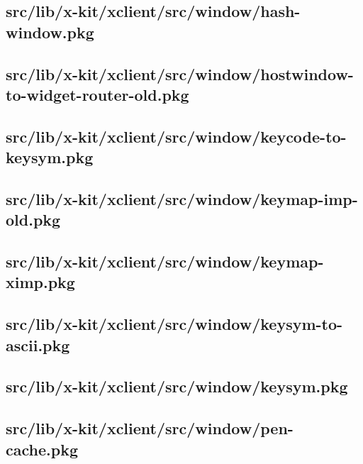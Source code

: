 \subsection{src/lib/x-kit/xclient/src/window/hash-window.pkg}


\subsection{src/lib/x-kit/xclient/src/window/hostwindow-to-widget-router-old.pkg}


\subsection{src/lib/x-kit/xclient/src/window/keycode-to-keysym.pkg}


\subsection{src/lib/x-kit/xclient/src/window/keymap-imp-old.pkg}


\subsection{src/lib/x-kit/xclient/src/window/keymap-ximp.pkg}


\subsection{src/lib/x-kit/xclient/src/window/keysym-to-ascii.pkg}


\subsection{src/lib/x-kit/xclient/src/window/keysym.pkg}


\subsection{src/lib/x-kit/xclient/src/window/pen-cache.pkg}


